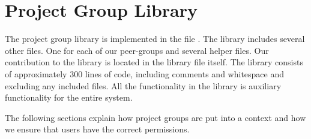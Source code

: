 \section{Project Group Library}
\label{sec:pglib}
The project group library is implemented in the file . 
The library includes several other files. %
One for each of our peer-groups and several helper files. 
Our contribution to the library is located in the library file itself. 
The library consists of approximately $300$ lines of code, including comments and whitespace and excluding any included files. 
All the functionality in the library is auxiliary functionality for the entire system. 

The following sections explain how project groups are put into a \moodle{} context and how we ensure that users have the correct permissions.


\FloatBarrier


\FloatBarrier











